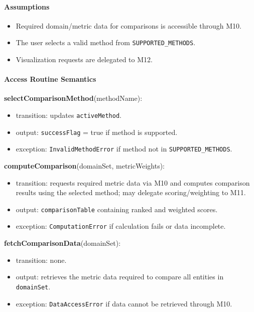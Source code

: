 \documentclass[12pt, titlepage]{article}
\begin{document}
\paragraph{Assumptions}
\begin{itemize}
  \item Required domain/metric data for comparisons is accessible through M10.
  \item The user selects a valid method from \texttt{SUPPORTED\_METHODS}.
  \item Visualization requests are delegated to M12.
\end{itemize}

\paragraph{Access Routine Semantics}

\noindent \textbf{selectComparisonMethod}(methodName):
\begin{itemize}
  \item transition: updates \texttt{activeMethod}.
  \item output: \texttt{successFlag} = true if method is supported.
  \item exception: \texttt{InvalidMethodError} if method not in \texttt{SUPPORTED\_METHODS}.
\end{itemize}

\noindent \textbf{computeComparison}(domainSet, metricWeights):
\begin{itemize}
  \item transition: requests required metric data via M10 and computes comparison results using the selected method; may delegate scoring/weighting to M11.
  \item output: \texttt{comparisonTable} containing ranked and weighted scores.
  \item exception: \texttt{ComputationError} if calculation fails or data incomplete.
\end{itemize}

\noindent \textbf{fetchComparisonData}(domainSet):
\begin{itemize}
  \item transition: none.
  \item output: retrieves the metric data required to compare all entities in \texttt{domainSet}.
  \item exception: \texttt{DataAccessError} if data cannot be retrieved through M10.
\end{itemize}
\end{document}
